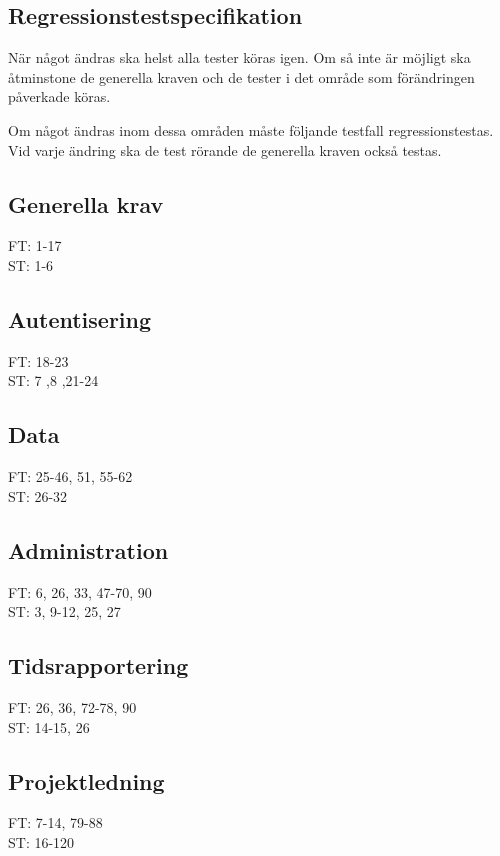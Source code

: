 \documentclass[a4paper]{article}
\begin{document}
\begin{appendices}

\section{Regressionstestspecifikation}

När något ändras ska helst alla tester köras igen. Om så inte är möjligt ska åtminstone de generella kraven och de tester i det område som förändringen påverkade köras.

Om något ändras inom dessa områden måste följande testfall regressionstestas. Vid varje ändring ska de test rörande de generella kraven också testas.

\subsection{Generella krav}

FT: 1-17\\
ST: 1-6

\subsection{Autentisering}

FT: 18-23\\
ST: 7 ,8 ,21-24

\subsection{Data}

FT: 25-46, 51, 55-62\\
ST: 26-32

\subsection{Administration}

FT: 6, 26, 33, 47-70, 90 \\
ST: 3, 9-12, 25, 27

\subsection{Tidsrapportering}

FT: 26, 36, 72-78, 90\\
ST: 14-15, 26

\subsection{Projektledning}

FT: 7-14, 79-88\\
ST: 16-120

\end{appendices}
\end{document}
